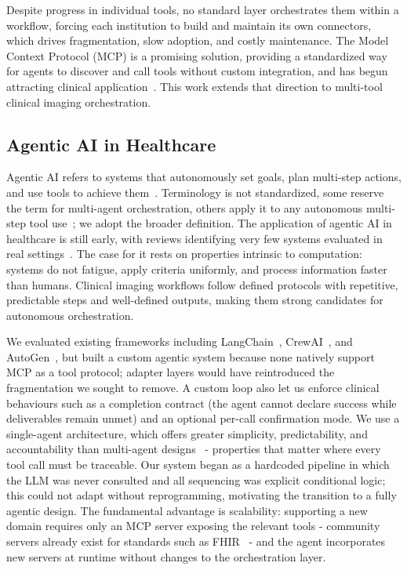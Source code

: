 \documentclass[conference]{IEEEtran}
\begin{document}
Despite progress in individual tools, no standard layer orchestrates them within a workflow, forcing each institution to build and maintain its own connectors, which drives fragmentation, slow adoption, and costly maintenance. The Model Context Protocol (MCP) is a promising solution, providing a standardized way for agents to discover and call tools without custom integration, and has begun attracting clinical application~\cite{transformingclinical2026, kalathas2026mcp, ehtesham2025mcpfhir}. This work extends that direction to multi-tool clinical imaging orchestration.

\subsection{Agentic AI in Healthcare}
Agentic AI refers to systems that autonomously set goals, plan multi-step actions, and use tools to achieve them~\cite{collaco2026scoping}. Terminology is not standardized, some reserve the term for multi-agent orchestration, others apply it to any autonomous multi-step tool use~\cite{abouali2026survey}; we adopt the broader definition. The application of agentic AI in healthcare is still early, with reviews identifying very few systems evaluated in real settings~\cite{collaco2026scoping, dietrich2025agentic}. The case for it rests on properties intrinsic to computation: systems do not fatigue, apply criteria uniformly, and process information faster than humans. Clinical imaging workflows follow defined protocols with repetitive, predictable steps and well-defined outputs, making them strong candidates for autonomous orchestration.

We evaluated existing frameworks including LangChain~\cite{langchain}, CrewAI~\cite{crewai}, and AutoGen~\cite{autogen}, but built a custom agentic system because none natively support MCP as a tool protocol; adapter layers would have reintroduced the fragmentation we sought to remove. A custom loop also let us enforce clinical behaviours such as a completion contract (the agent cannot declare success while deliverables remain unmet) and an optional per-call confirmation mode. We use a single-agent architecture, which offers greater simplicity, predictability, and accountability than multi-agent designs~\cite{collaco2026scoping} - properties that matter where every tool call must be traceable. Our system began as a hardcoded pipeline in which the LLM was never consulted and all sequencing was explicit conditional logic; this could not adapt without reprogramming, motivating the transition to a fully agentic design. The fundamental advantage is scalability: supporting a new domain requires only an MCP server exposing the relevant tools - community servers already exist for standards such as FHIR~\cite{ehtesham2025mcpfhir} - and the agent incorporates new servers at runtime without changes to the orchestration layer.
\end{document}
